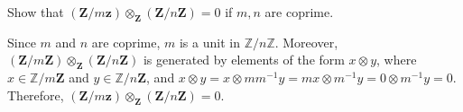 \begin{exercise}
Show that \((\mathbf{Z} / m \mathbf{z}) \otimes_{\mathbf{Z}} (\mathbf{Z} / n \mathbf{Z}) = 0\) if \(m, n\) are coprime.
\end{exercise}

\begin{solution}
Since \(m\) and \(n\) are coprime, \(m\) is a unit in \(\mathbb{Z} / n \mathbb{Z}\).
Moreover, \((\mathbf{Z} / m \mathbf{Z}) \otimes_{\mathbf{Z}} (\mathbf{Z} / n \mathbf{Z})\) is generated by elements of the form \(x \otimes y\), where \(x \in \mathbb{Z} / m \mathbf{Z}\) and \(y \in \mathbb{Z} / n \mathbf{Z}\), and \(x \otimes y = x \otimes m m^{-1} y = m x \otimes m^{-1} y = 0 \otimes m^{-1} y = 0\).
Therefore, \((\mathbf{Z} / m \mathbf{z}) \otimes_{\mathbf{Z}} (\mathbf{Z} / n \mathbf{Z}) = 0\).
\end{solution}